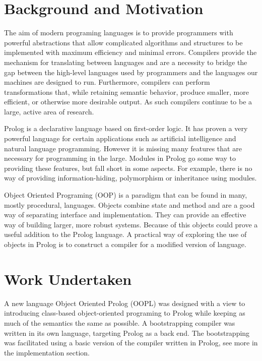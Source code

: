 \documentclass[12pt,a4paper,twoside,openright]{report}
\begin{document}
\section{Background and Motivation}

The aim of modern programing languages is to provide programmers with powerful abstractions that allow complicated algorithms and structures to be implemented with maximum efficiency and minimal errors. Compilers provide the mechanism for translating between languages and are a necessity to bridge the gap between the high-level languages used by programmers and the languages our machines are designed to run. Furthermore, compilers can perform transformations that, while retaining semantic behavior, produce smaller, more efficient, or otherwise more desirable output. As such compilers continue to be a large, active area of research.

\bigskip

Prolog is a declarative language based on first-order logic. It has proven a very powerful language for certain applications such as artificial intelligence\cite{AIBOOK} and natural language programming\cite{NLPBOOK}. However it is missing many features that are necessary for programming in the large. Modules in Prolog go some way to providing these features, but fall short in some aspects. For example, there is no way of providing information-hiding, polymorphism or inheritance using modules.

\bigskip

Object Oriented Programing (OOP) is a paradigm that can be found in many, mostly procedural, languages. Objects combine state and method and are a good way of separating interface and implementation. They can provide an effective way of building larger, more robust systems. Because of this objects could prove a useful addition to the Prolog language. A practical way of exploring the use of objects in Prolog is to construct a compiler for a modified version of language.

\section{Work Undertaken}

A new language Object Oriented Prolog (OOPL) was designed with a view to introducing class-based object-oriented programing to Prolog while keeping as much of the semantics the same as possible. A bootstrapping compiler was written in its own language, targeting Prolog as a back end. The bootstrapping was facilitated using a basic version of the compiler written in Prolog, see more in the implementation section.
\end{document}
